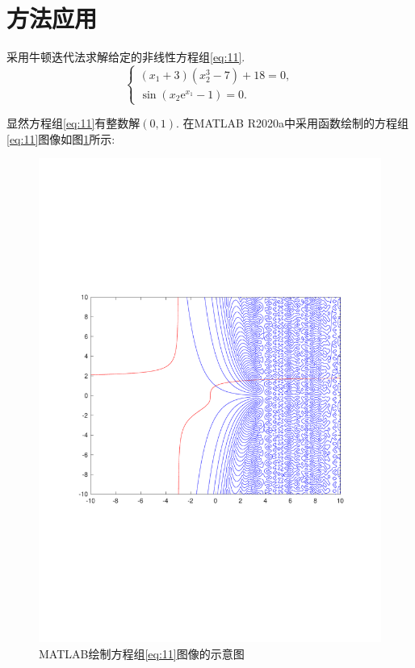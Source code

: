 \documentclass[cn,12pt,founder,a4paper]{elegantpaper}
\newcommand*{\e}{\mathrm{e}}
\begin{document}
\section{方法应用}
\setcounter{table}{0}
\setcounter{figure}{0}
\setcounter{equation}{0}
采用牛顿迭代法求解给定的非线性方程组\eqref{eq:11}.
\begin{equation}\label{eq:11}
  \begin{cases}
    (x_1+3)(x_2^3-7)+18=0,\\
    \sin(x_2\e^{x_1}-1)=0.
  \end{cases}
\end{equation}\par
显然方程组\eqref{eq:11}有整数解\((0,1)\). 在M{\footnotesize{ATLAB}} R2020a中采用函数绘制的方程组\eqref{eq:11}图像如图\ref{pic:1}所示:
\begin{figure}[H]
  \centering
  \includegraphics[scale=0.65]{image/MATLAB.pdf}
  \caption{{M\footnotesize{ATLAB}}绘制方程组\eqref{eq:11}图像的示意图}
  \label{pic:1}
\end{figure}\par
\end{document}
